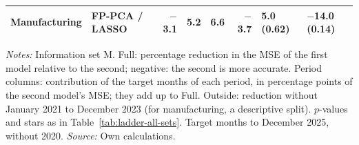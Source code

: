 \begin{threeparttable}
\begin{tabular}{llrrrrll}
Manufacturing & FP-PCA / LASSO & $-$3.1 & 5.2 & 6.6 & $-$3.7 & 5.0 (0.62) & $-$14.0 (0.14) \\
\bottomrule
\end{tabular}
\begin{tablenotes}[flushleft]\footnotesize
\item \textit{Notes:} Information set M. Full: percentage reduction in the MSE of the first model relative to the second; negative: the second is more accurate. Period columns: contribution of the target months of each period, in percentage points of the second model's MSE; they add up to Full. Outside: reduction without January 2021 to December 2023 (for manufacturing, a descriptive split). $p$-values and stars as in Table~\ref{tab:ladder-all-sets}. Target months to December 2025, without 2020. \textit{Source:} Own calculations.
\end{tablenotes}
\end{threeparttable}
